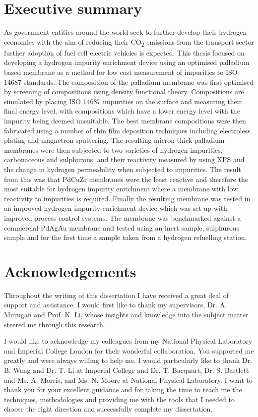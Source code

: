 \documentclass[a4paper,12pt]{report}
\begin{document}
\chapter*{Executive summary}
As government entities around the world seek to further develop their hydrogen economies with the aim of reducing their CO\textsubscript{2} emissions from the transport sector further adoption of fuel cell electric vehicles is expected. This thesis focused on developing a hydrogen impurity enrichment device using an optimised palladium based membrane as a method for low cost measurement of impurities to ISO 14687 standards. The composition of the palladium membrane was first optimised by screening of compositions using density functional theory. Compositions are simulated by placing ISO 14687 impurities on the surface and measuring their final energy level, with compositions which have a lower energy level with the impurity being deemed unsuitable. The best membrane compositions were then fabricated using a number of thin film deposition techniques including electroless plating and magnetron sputtering. The resulting micron thick palladium membranes were then subjected to two varieties of hydrogen impurities, carbonaceous and sulphurous, and  their reactivity measured by using XPS and the change in hydrogen permeability when subjected to impurities. The result from this was that PdCuZr membranes were the least reactive and therefore the most suitable for hydrogen impurity enrichment where a membrane with low reactivity to impurities is required. Finally the resulting membrane was tested in an improved hydrogen impurity enrichment device which was set up with improved process control systems. The membrane was benchmarked against a commercial PdAgAu membrane and tested using an inert sample, sulphurous sample and for the first time a sample taken from a hydrogen refuelling station.

\chapter*{Acknowledgements}
Throughout the writing of this dissertation I have received a great deal of support and assistance. I  would  first  like  to  thank  my  supervisors,  Dr.  A.  Murugan and Prof. K. Li, whose insights and knowledge into the subject matter steered me through this research.

I would like to acknowledge my colleagues from my National Physical Laboratory and Imperial College London for their wonderful collaboration. You supported me greatly and were always willing to help me. I would particularly like to thank Dr. B. Wang and Dr. T. Li at Imperial College and Dr. T. Bacquart, Dr. S. Bartlett and Ms. A. Morris, and Ms. N. Moore at National Physical Laboratory. I want to thank you for your excellent guidance and  for  taking the time to teach me the techniques, methodologies and providing  me  with  the  tools  that I  needed  to  choose  the  right  direction  and  successfully complete my dissertation.
\end{document}
